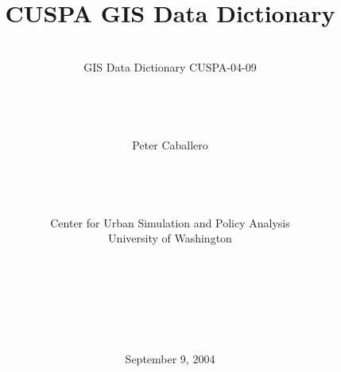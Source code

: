 
\title{{ \\
CUSPA GIS Data Dictionary}}

\author{\\ %
GIS Data Dictionary CUSPA-04-09
\\\\\\\\\\
Peter Caballero
\\\\\\\\\\
 Center for Urban Simulation and Policy Analysis \\
University of Washington \\\\\\\\\\\\\\}

\date{September 9, 2004}

\maketitle
